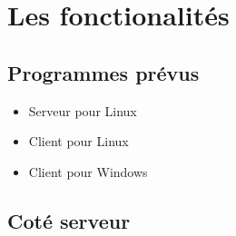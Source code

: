 \documentclass[12pt,a4paper,twoside]{article}
\begin{document}
    \section{Les fonctionalités}

    \subsection*{Programmes prévus}

    \begin{itemize}
        \item{} Serveur pour Linux
        \item{} Client pour Linux
        \item{} Client pour Windows
    \end{itemize}

    \subsection*{Coté serveur}
\end{document}
